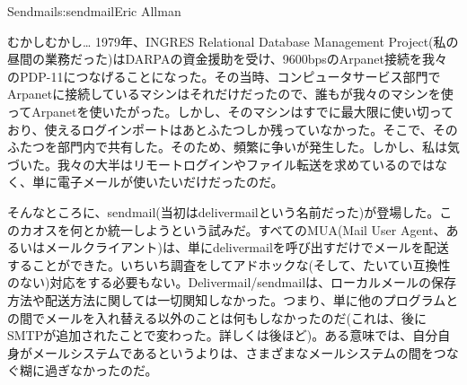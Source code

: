\begin{aosachapter}{Sendmail}{s:sendmail}{Eric Allman}
\begin{aosasect1}{むかしむかし\ldots}
1979年、INGRES Relational Database Management Project(私の昼間の業務だった)はDARPAの資金援助を受け、9600bpsのArpanet接続を我々のPDP-11につなげることになった。その当時、コンピュータサービス部門でArpanetに接続しているマシンはそれだけだったので、誰もが我々のマシンを使ってArpanetを使いたがった。しかし、そのマシンはすでに最大限に使い切っており、使えるログインポートはあとふたつしか残っていなかった。そこで、そのふたつを部門内で共有した。そのため、頻繁に争いが発生した。しかし、私は気づいた。我々の大半はリモートログインやファイル転送を求めているのではなく、単に電子メールが使いたいだけだったのだ。

そんなところに、sendmail(当初はdelivermailという名前だった)が登場した。このカオスを何とか統一しようという試みだ。すべてのMUA(Mail User Agent、あるいはメールクライアント)は、単にdelivermailを呼び出すだけでメールを配送することができた。いちいち調査をしてアドホックな(そして、たいてい互換性のない)対応をする必要もない。Delivermail/sendmailは、ローカルメールの保存方法や配送方法に関しては一切関知しなかった。つまり、単に他のプログラムとの間でメールを入れ替える以外のことは何もしなかったのだ(これは、後にSMTPが追加されたことで変わった。詳しくは後ほど)。ある意味では、自分自身がメールシステムであるというよりは、さまざまなメールシステムの間をつなぐ糊に過ぎなかったのだ。


\end{aosasect1}
\end{aosachapter}
